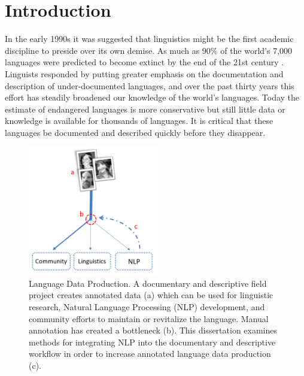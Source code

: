 \chapter{Introduction}
\label{chap:intro}

In the early 1990s it was suggested that linguistics might be the first academic discipline to preside over its own demise. As much as 90\% of the world’s 7,000 languages were predicted to become extinct by the end of the 21st century \citep{krauss_worlds_1992,krauss_keynote--mass_2007,campbell_new_2013}. 
Linguists responded by putting greater emphasis on the documentation and description of under-documented languages, and over the past thirty years this effort has steadily broadened our knowledge of the world's languages. Today the estimate of endangered languages is more conservative \citep{eberhard_ethnologue:2020} but still little data or knowledge is available for thousands of languages. It is critical that these languages be documented and described quickly before they disappear. %

\begin{figure}[tb]
\centering
\includegraphics[width=5.75cm]{figs/Flowchart.PNG}
\caption[Language Data Production]{Language Data Production.  A documentary and descriptive field project creates annotated data (a) which can be used for linguistic research, Natural Language Processing (NLP) development, and community efforts to maintain or revitalize the language. Manual annotation has created a bottleneck (b). This dissertation examines methods for integrating NLP into the documentary and descriptive workflow in order to increase annotated language data production (c).}
\label{fig:flowchart}
\end{figure}

